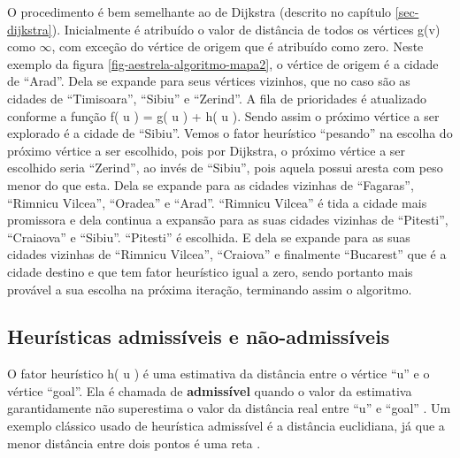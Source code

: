 O procedimento é bem semelhante ao de Dijkstra (descrito no capítulo \ref{sec-dijkstra}). Inicialmente é atribuído o valor de distância de todos os vértices g(v) como $\infty$, com exceção do vértice de origem que é atribuído como zero. Neste exemplo da figura \ref{fig-aestrela-algoritmo-mapa2}, o vértice de origem é a cidade de ``Arad''. Dela se expande para seus vértices vizinhos, que no caso são as cidades de ``Timisoara'', ``Sibiu'' e ``Zerind''. A fila de prioridades é atualizado conforme a função f( u ) = g( u ) + h( u ). Sendo assim o próximo vértice a ser explorado é a cidade de ``Sibiu''. Vemos o fator heurístico ``pesando'' na escolha do próximo vértice a ser escolhido, pois por Dijkstra, o próximo vértice a ser escolhido seria ``Zerind'', ao invés de ``Sibiu'', pois aquela possui aresta com peso menor do que esta. Dela se expande para as cidades vizinhas de ``Fagaras'', ``Rimnicu Vilcea'', ``Oradea'' e ``Arad''. ``Rimnicu Vilcea'' é tida a cidade mais promissora e dela continua a expansão para as suas cidades vizinhas de ``Pitesti'', ``Craiaova'' e ``Sibiu''. ``Pitesti'' é escolhida. E dela se expande para as suas cidades vizinhas de ``Rimnicu Vilcea'', ``Craiova'' e finalmente ``Bucarest'' que é a cidade destino e que tem fator heurístico igual a zero, sendo portanto mais provável a sua escolha na próxima iteração, terminando assim o algoritmo.






\subsection{Heurísticas admissíveis e não-admissíveis}
\label{sec-aestrela-algoritmo-heuristica}  
O fator heurístico h( u ) é uma estimativa da distância entre o vértice ``u'' e o vértice ``goal''. Ela é chamada de \textbf{admissível} quando o valor da estimativa garantidamente não superestima o valor da distância real entre ``u'' e ``goal'' \cite{russell1995modern}. Um exemplo clássico usado de heurística admissível é a distância euclidiana, já que a menor distância entre dois pontos é uma reta \cite{russell1995modern}.

